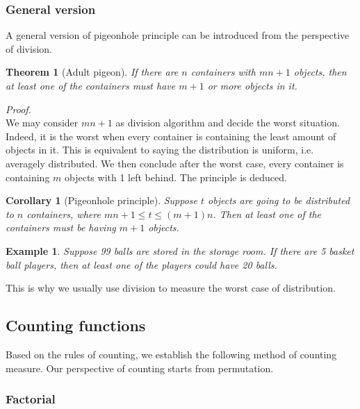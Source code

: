 \documentclass[12pt]{article}
\newtheorem*{theorem}{Theorem}
\newtheorem*{corollary}{Corollary}
\newtheorem*{example}{Example}
\renewenvironment{proof}[1][Proof]{\begin{snugshade*} \textit{{#1}.}\\}{\hfill \qedsymbol \end{snugshade*}}
\begin{document}
    \subsubsection*{General version}

    A general version of pigeonhole principle can be introduced from the perspective of division.

    \begin{theorem}[Adult pigeon]
        If there are $n$ containers with $mn+1$ objects, then at least one of the containers must have $m+1$ or more objects in it.
    \end{theorem}

    \begin{proof}
        We may consider $mn+1$ as division algorithm and decide the worst situation. Indeed, it is the worst when every container is containing the least amount of objects in it. This is equivalent to saying the distribution is uniform, i.e. averagely distributed. We then conclude after the worst case, every container is containing $m$ objects with 1 left behind. The principle is deduced.
    \end{proof}

    \begin{corollary}[Pigeonhole principle]
        Suppose $t$ objects are going to be distributed to $n$ containers, where $mn+1\leq t\leq (m+1)n$. Then at least one of the containers must be having $m+1$ objects.
    \end{corollary}

    \begin{example}
        Suppose 99 balls are stored in the storage room. If there are 5 basket ball players, then at least one of the players could have 20 balls.
    \end{example}

    This is why we usually use division to measure the worst case of distribution.

    \subsection{Counting functions}

    Based on the rules of counting, we establish the following method of counting measure. Our perspective of counting starts from permutation.

    \subsubsection*{Factorial}
\end{document}
